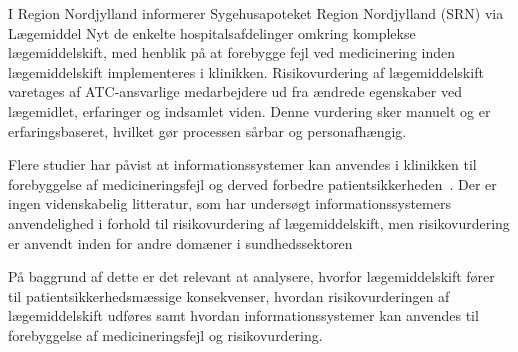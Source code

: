 I Region Nordjylland informerer Sygehusapoteket Region Nordjylland (SRN) via Lægemiddel Nyt de enkelte hospitalsafdelinger omkring komplekse lægemiddelskift, med henblik på at forebygge fejl ved medicinering inden lægemiddelskift implementeres i klinikken. Risikovurdering af lægemiddelskift varetages af ATC-ansvarlige medarbejdere ud fra ændrede egenskaber ved lægemidlet, erfaringer og indsamlet viden. Denne vurdering sker manuelt og er erfaringsbaseret, hvilket gør processen sårbar og personafhængig.

Flere studier har påvist at informationssystemer kan anvendes i klinikken til forebyggelse af medicineringsfejl og derved forbedre patientsikkerheden~\citep{Agrawal2009, Stenner2010, Fischer2008, Simpson2008}. Der er ingen videnskabelig litteratur, som har undersøgt informationssystemers anvendelighed i forhold til risikovurdering af lægemiddelskift, men risikovurdering er anvendt inden for andre domæner i sundhedssektoren~\citep{Geissert2018, Boyko1990, Rawshani2018} 

På baggrund af dette er det relevant at analysere, hvorfor lægemiddelskift fører til patientsikkerhedsmæssige konsekvenser, hvordan risikovurderingen af lægemiddelskift udføres samt hvordan informationssystemer kan anvendes til forebyggelse af medicineringsfejl og risikovurdering. 
